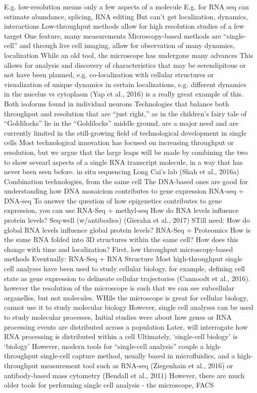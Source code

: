 E.g. low-resolution means only a few aspects of a molecule
E.g. for RNA seq can estimate abundance, splicing, RNA editing
But can’t get localization, dynamics, interactions
Low-throughput methods allow for high resolution studies of a few target
One feature, many measurements
Microscopy-based methods are “single-cell” and through live cell imaging, allow for observation of many dynamics, localization
While an old tool, the microscope has undergone many advances
This allows for analysis and discovery of characteristics that may be serendipitous or not have been planned, e.g. co-localization with cellular structures or visualization of unique dynamics in certain localizations, e.g. different dynamics in the nucelus vs cytoplasm
(Yap et al., 2016) is a really great example of this. Both isoforms found in individual neurons
Technologies that balance both throughput and resolution that are “just right,” as in the children’s fairy tale of “Goldilocks” 
lie in the “Goldilocks” middle ground, are a major need and are currently limited in the still-growing field of technological development in single cells
Most technological innovation has focused on increasing throughput or resolution, but we argue that the large leaps will be made by combining the two to show sevearl aspects of a single RNA transcript molecule, in a way that has never been seen before.
in situ sequencing Long Cai’s lab (Shah et al., 2016a)
Combination technologies, from the same cell
The DNA-based ones are good for understanding how DNA mosaicism contributes to gene expression
RNA-seq + DNA-seq
To answer the question of how epigenetics contributes to gene expression, you can use RNA-Seq + methyl-seq
How do RNA levels influence protein levels?
Seq-well (w/antibodies) (Gierahn et al., 2017)
STill need:
How do global RNA levels influence global protein levels?
RNA-Seq + Proteomics 
How is the same RNA folded into 3D structures within the same cell? How does this change with time and localization?
First, low throughput microscopy-based methods
Eventually: RNA-Seq + RNA Structure
Most high-throughput single cell analyses have been used to study cellular biology, for example, defining cell state as gene expression to delineate cellular trajectories (Cannoodt et al., 2016).
however the resolution of the microscope is such that we can see subcellular organelles, but not molecules. 
WHile the microscope is great for cellular biology, cannot use it to study molecular biology
However, single cell analyses can be used to study molecular processes, 
Initial studies were about how genes or RNA processing events are distributed across a population
Later, will interrogate how RNA processing is distributed within a cell 
Ultimately, ‘single-cell biology’ is ‘biology’
However, modern tools for “single-cell analysis” couple a high-throughput single-cell capture method, usually based in microfluidics, and a high-throughput measurement tool such as RNA-seq (Ziegenhain et al., 2016) or antibody-based mass cytometry (Bendall et al., 2011)
However, there are much older tools for performing single cell analysis - the microscope, FACS

